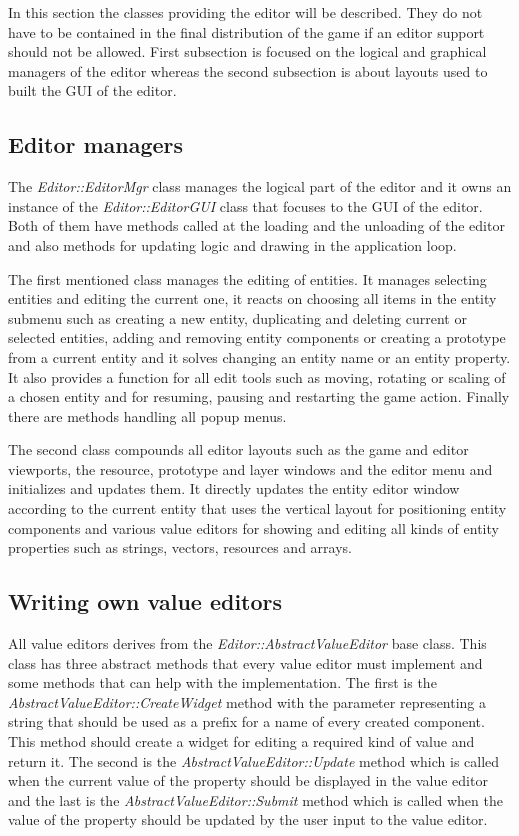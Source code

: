 In this section the classes providing the editor will be described. They do not have to be contained in the final distribution of the game if an editor support should not be allowed. First subsection is focused on the logical and graphical managers of the editor whereas the second subsection is about layouts used to built the GUI of the editor.

\subsection{Editor managers}

The \emph{Editor::EditorMgr} class manages the logical part of the editor and it owns an instance of the \emph{Editor::EditorGUI} class that focuses to the GUI of the editor. Both of them have methods called at the loading and the unloading of the editor and also methods for updating logic and drawing in the application loop.

The first mentioned class manages the editing of entities. It manages selecting entities and editing the current one, it reacts on choosing all items in the entity submenu such as creating a new entity, duplicating and deleting current or selected entities, adding and removing entity components or creating a prototype from a current entity and it solves changing an entity name or an entity property. It also provides a function for all edit tools such as moving, rotating or scaling of a chosen entity and for resuming, pausing and restarting the game action. Finally there are methods handling all popup menus.

The second class compounds all editor layouts such as the game and editor viewports, the resource, prototype and layer windows and the editor menu and initializes and updates them. It directly updates the entity editor window according to the current entity that uses the vertical layout for positioning entity components and various value editors for showing and editing all kinds of entity properties such as strings, vectors, resources and arrays.

\subsection{Writing own value editors}

All value editors derives from the \emph{Editor::AbstractValueEditor} base class. This class has three abstract methods that every value editor must implement and some methods that can help with the implementation. The first is the \emph{AbstractValueEditor::CreateWidget} method with the parameter representing a string that should be used as a prefix for a name of every created component. This method should create a widget for editing a required kind of value and return it. The second is the \emph{AbstractValueEditor::Update} method which is called when the current value of the property should be displayed in the value editor and the last is the \emph{AbstractValueEditor::Submit} method which is called when the value of the property should be updated by the user input to the value editor.

